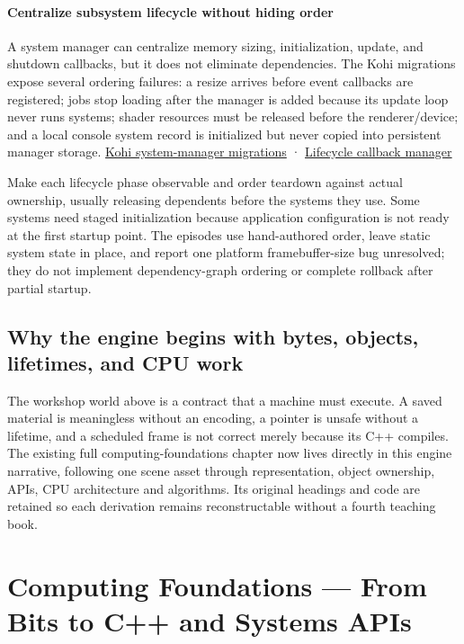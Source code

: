 \paragraph{Centralize subsystem lifecycle without hiding order}\label{05-engine-i-ch001-centralize-subsystem-lifecycle-without-hiding-order}

A system manager can centralize memory sizing, initialization, update, and shutdown callbacks, but it does not eliminate dependencies. The Kohi migrations expose several ordering failures: a resize arrives before event callbacks are registered; jobs stop loading after the manager is added because its update loop never runs systems; shader resources must be released before the renderer/device; and a local console system record is initialized but never copied into persistent manager storage. \href{https://www.youtube.com/watch?v=l6QDHJ7_rPk}{Kohi system-manager migrations} · \href{https://www.youtube.com/watch?v=vOrkxRPWDVA}{Lifecycle callback manager}

Make each lifecycle phase observable and order teardown against actual ownership, usually releasing dependents before the systems they use. Some systems need staged initialization because application configuration is not ready at the first startup point. The episodes use hand-authored order, leave static system state in place, and report one platform framebuffer-size bug unresolved; they do not implement dependency-graph ordering or complete rollback after partial startup.

\subsection{Why the engine begins with bytes, objects, lifetimes, and CPU work}\label{05-engine-i-ch001-why-the-engine-begins-with-bytes-objects-lifetimes-and-cpu-work}

The workshop world above is a contract that a machine must execute. A saved material is meaningless without an encoding, a pointer is unsafe without a lifetime, and a scheduled frame is not correct merely because its C++ compiles. The existing full computing-foundations chapter now lives directly in this engine narrative, following one scene asset through representation, object ownership, APIs, CPU architecture and algorithms. Its original headings and code are retained so each derivation remains reconstructable without a fourth teaching book.

\section{Computing Foundations --- From Bits to C++ and Systems APIs}\label{05-engine-i-ch001-computing-foundations-from-bits-to-c-and-systems-apis}

